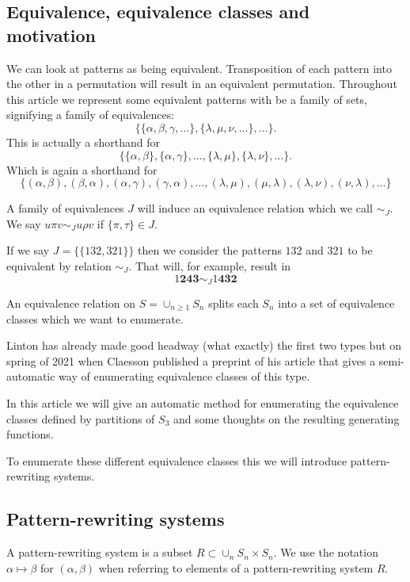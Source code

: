 \documentclass[openany, a4paper, 11pt, english]{article}
\newcommand{\patternrule}{ \mapsto \!}
\theoremstyle{definition}
\newcommand{\Sym}{S}
\begin{document}
\subsection{Equivalence, equivalence classes and motivation}
We can look at patterns as being equivalent. Transposition of each pattern into
the other in a permutation will result in an equivalent permutation. Throughout
this article we represent some equivalent patterns with be a family of sets, signifying
a family of equivalences:
\[
    \{ \{\alpha, \beta, \gamma, \dots \}, \{\lambda, \mu, \nu, \dots \}, \dots
    \}.
\]
This is actually a shorthand for
\[
    \{ \{ \alpha, \beta \}, \{ \alpha, \gamma \}, \dots, \{ \lambda, \mu \}, \{
        \lambda, \nu \}, \dots \}.
\]
Which is again a shorthand for
\[
    \{ (\alpha, \beta), (\beta, \alpha), (\alpha, \gamma), (\gamma, \alpha),
    \dots, (\lambda, \mu), (\mu, \lambda), (\lambda, \nu), (\nu, \lambda), \dots \}
\]

A family of equivalences $J$ will induce an equivalence relation which we call $\sim_J$. We
say $u \pi v \sim_J u \rho v$ if $\{ \pi, \tau \} \in J$.

If we say $J = \{ \{ 132, 321 \} \}$ then we consider the patterns $132$ and $321$ to
be equivalent by relation $\sim_J$. That will, for example, result in
\[
    1\bm{243} \sim_J 1\bm{432}
\]

An equivalence relation on $\Sym = \cup_{n \geq 1} \Sym_n$ splits each $\Sym_n$
into a set of equivalence classes which we want to enumerate. 

Linton has already made good headway (what exactly) the first two types but on
spring of 2021 when Claesson published a preprint of his article that gives a
semi-automatic way of enumerating equivalence classes of this type.

In this article we will give an automatic method for enumerating the equivalence
classes defined by partitions of $\Sym_3$ and some thoughts on the resulting generating functions.

To enumerate these different equivalence classes this we will introduce
pattern-rewriting systems.

\subsection{Pattern-rewriting systems}
A pattern-rewriting system is a subset $R \subset \cup_{n} \Sym_n \times \Sym_n$.
We use the notation $\alpha \patternrule \beta$ for $(\alpha, \beta)$ when referring
to elements of a pattern-rewriting system $R$. 
\end{document}
